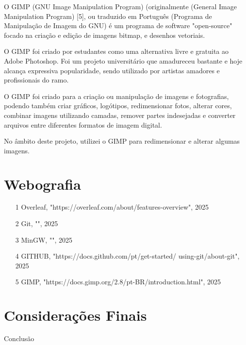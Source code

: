 \documentclass[a4paper,12pt]{article}
\begin{document}
O GIMP (GNU Image Manipulation Program) (originalmente (General Image Manipulation Program) [5], ou traduzido em Português (Programa de Manipulação de Imagem do GNU) é um programa de software "open-source" focado na criação e edição de imagens bitmap, e desenhos vetoriais.

O GIMP foi criado por estudantes como uma alternativa livre e gratuita ao Adobe Photoshop. Foi um projeto universitário que amadureceu bastante e hoje alcança expressiva popularidade, sendo utilizado por artistas amadores e profissionais do ramo.

O GIMP foi criado para a criação ou manipulação de imagens e fotografias, podendo também criar gráficos, logótipos, redimensionar fotos, alterar cores, combinar imagens utilizando camadas, remover partes indesejadas e converter arquivos entre diferentes formatos de imagem digital.

No âmbito deste projeto, utilizei o GIMP para redimensionar e alterar algumas imagens.

\section{Webografia}
\begin{itemize}
    \item [1] Overleaf, "https://overleaf.com/about/features-overview", 2025

    \item [2] Git, "", 2025

    \item [3] MinGW, "", 2025
    
    \item [4] GITHUB, "https://docs.github.com/pt/get-started/
    \newline
    using-git/about-git", 2025
    
    \item [5] GIMP, "https://docs.gimp.org/2.8/pt-BR/introduction.html", 2025
    
\end{itemize}

\section{Considerações Finais}

Conclusão
\end{document}
